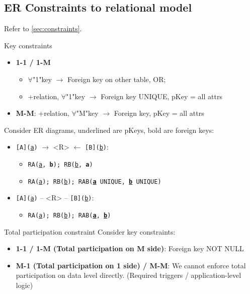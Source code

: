 \subsection{ER Constraints to relational model}

Refer to \ref{sec:constraints}.

\begin{theorem}
    {Key constraints}
    \begin{itemize}
        \item \textbf{1-1 / 1-M}
              \begin{itemize}
                  \item $\forall$"1"key $\to$ Foreign key on other table, OR;
                  \item +relation, $\forall$"1"key $\to$ Foreign key UNIQUE, pKey = all attrs
              \end{itemize}
        \item \textbf{M-M}: +relation, $\forall$"M"key $\to$ Foreign key, pKey = all attrs
    \end{itemize}

    \tcblower

    Consider ER diagrams, underlined are pKeys, bold are foreign keys:
    \begin{itemize}
        \item \texttt{[A](\underline{a})} $\rightarrow$ <R> $\leftarrow$ \texttt{[B](\underline{b})}:
              \begin{itemize}
                  \item \texttt{RA(\underline{a}, \textbf{b}); RB(\underline{b}, \textbf{a})}
                  \item \texttt{RA(\underline{a}); RB(\underline{b}); RAB(\textbf{\underline{a}} UNIQUE, \textbf{\underline{b}} UNIQUE)}
              \end{itemize}
        \item \texttt{[A](\underline{a})} -- <R> -- \texttt{[B](\underline{b})}:
              \begin{itemize}
                  \item \texttt{RA(\underline{a}); RB(\underline{b}); RAB(\textbf{\underline{a}}, \textbf{\underline{b}})}
              \end{itemize}
    \end{itemize}
\end{theorem}

\begin{theorem}
    {Total participation constraint}
    Consider key constraints:
    \begin{itemize}
        \item \textbf{1-1 / 1-M (Total participation on M side)}: Foreign key NOT NULL
        \item \textbf{M-1 (Total participation on 1 side) / M-M}:  We cannot enforce total participation on data level directly. (Required triggers / application-level logic)
    \end{itemize}
\end{theorem}


